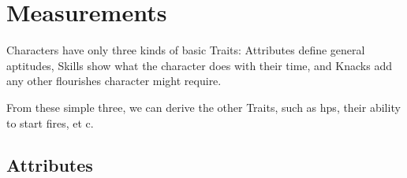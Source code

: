 \chapter{Measurements}

Characters have only three kinds of basic Traits: Attributes define general aptitudes, Skills show what the character does with their time, and Knacks add any other flourishes character might require.

From these simple three, we can derive the other Traits, such as \glspl{hp}, their ability to start fires, et c.

\section{Attributes}
\label{randomAttributes}

